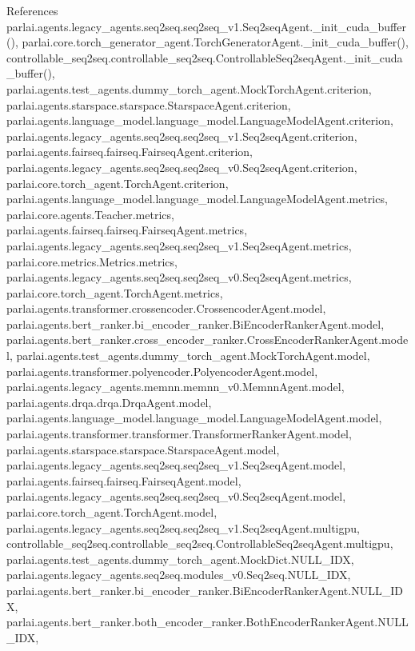 References parlai.\+agents.\+legacy\+\_\+agents.\+seq2seq.\+seq2seq\+\_\+v1.\+Seq2seq\+Agent.\+\_\+init\+\_\+cuda\+\_\+buffer(), parlai.\+core.\+torch\+\_\+generator\+\_\+agent.\+Torch\+Generator\+Agent.\+\_\+init\+\_\+cuda\+\_\+buffer(), controllable\+\_\+seq2seq.\+controllable\+\_\+seq2seq.\+Controllable\+Seq2seq\+Agent.\+\_\+init\+\_\+cuda\+\_\+buffer(), parlai.\+agents.\+test\+\_\+agents.\+dummy\+\_\+torch\+\_\+agent.\+Mock\+Torch\+Agent.\+criterion, parlai.\+agents.\+starspace.\+starspace.\+Starspace\+Agent.\+criterion, parlai.\+agents.\+language\+\_\+model.\+language\+\_\+model.\+Language\+Model\+Agent.\+criterion, parlai.\+agents.\+legacy\+\_\+agents.\+seq2seq.\+seq2seq\+\_\+v1.\+Seq2seq\+Agent.\+criterion, parlai.\+agents.\+fairseq.\+fairseq.\+Fairseq\+Agent.\+criterion, parlai.\+agents.\+legacy\+\_\+agents.\+seq2seq.\+seq2seq\+\_\+v0.\+Seq2seq\+Agent.\+criterion, parlai.\+core.\+torch\+\_\+agent.\+Torch\+Agent.\+criterion, parlai.\+agents.\+language\+\_\+model.\+language\+\_\+model.\+Language\+Model\+Agent.\+metrics, parlai.\+core.\+agents.\+Teacher.\+metrics, parlai.\+agents.\+fairseq.\+fairseq.\+Fairseq\+Agent.\+metrics, parlai.\+agents.\+legacy\+\_\+agents.\+seq2seq.\+seq2seq\+\_\+v1.\+Seq2seq\+Agent.\+metrics, parlai.\+core.\+metrics.\+Metrics.\+metrics, parlai.\+agents.\+legacy\+\_\+agents.\+seq2seq.\+seq2seq\+\_\+v0.\+Seq2seq\+Agent.\+metrics, parlai.\+core.\+torch\+\_\+agent.\+Torch\+Agent.\+metrics, parlai.\+agents.\+transformer.\+crossencoder.\+Crossencoder\+Agent.\+model, parlai.\+agents.\+bert\+\_\+ranker.\+bi\+\_\+encoder\+\_\+ranker.\+Bi\+Encoder\+Ranker\+Agent.\+model, parlai.\+agents.\+bert\+\_\+ranker.\+cross\+\_\+encoder\+\_\+ranker.\+Cross\+Encoder\+Ranker\+Agent.\+model, parlai.\+agents.\+test\+\_\+agents.\+dummy\+\_\+torch\+\_\+agent.\+Mock\+Torch\+Agent.\+model, parlai.\+agents.\+transformer.\+polyencoder.\+Polyencoder\+Agent.\+model, parlai.\+agents.\+legacy\+\_\+agents.\+memnn.\+memnn\+\_\+v0.\+Memnn\+Agent.\+model, parlai.\+agents.\+drqa.\+drqa.\+Drqa\+Agent.\+model, parlai.\+agents.\+language\+\_\+model.\+language\+\_\+model.\+Language\+Model\+Agent.\+model, parlai.\+agents.\+transformer.\+transformer.\+Transformer\+Ranker\+Agent.\+model, parlai.\+agents.\+starspace.\+starspace.\+Starspace\+Agent.\+model, parlai.\+agents.\+legacy\+\_\+agents.\+seq2seq.\+seq2seq\+\_\+v1.\+Seq2seq\+Agent.\+model, parlai.\+agents.\+fairseq.\+fairseq.\+Fairseq\+Agent.\+model, parlai.\+agents.\+legacy\+\_\+agents.\+seq2seq.\+seq2seq\+\_\+v0.\+Seq2seq\+Agent.\+model, parlai.\+core.\+torch\+\_\+agent.\+Torch\+Agent.\+model, parlai.\+agents.\+legacy\+\_\+agents.\+seq2seq.\+seq2seq\+\_\+v1.\+Seq2seq\+Agent.\+multigpu, controllable\+\_\+seq2seq.\+controllable\+\_\+seq2seq.\+Controllable\+Seq2seq\+Agent.\+multigpu, parlai.\+agents.\+test\+\_\+agents.\+dummy\+\_\+torch\+\_\+agent.\+Mock\+Dict.\+N\+U\+L\+L\+\_\+\+I\+DX, parlai.\+agents.\+legacy\+\_\+agents.\+seq2seq.\+modules\+\_\+v0.\+Seq2seq.\+N\+U\+L\+L\+\_\+\+I\+DX, parlai.\+agents.\+bert\+\_\+ranker.\+bi\+\_\+encoder\+\_\+ranker.\+Bi\+Encoder\+Ranker\+Agent.\+N\+U\+L\+L\+\_\+\+I\+DX, parlai.\+agents.\+bert\+\_\+ranker.\+both\+\_\+encoder\+\_\+ranker.\+Both\+Encoder\+Ranker\+Agent.\+N\+U\+L\+L\+\_\+\+I\+DX, 